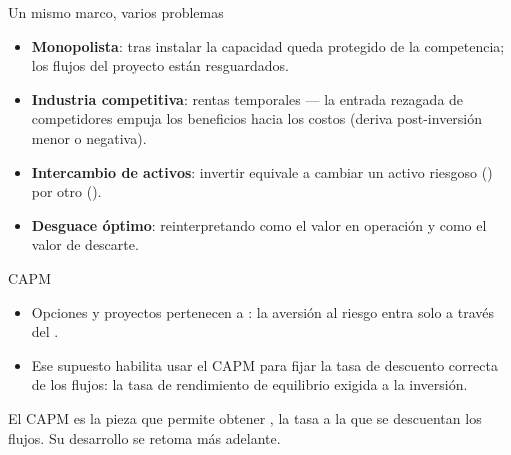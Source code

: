 \begin{frame}{Un mismo marco, varios problemas}
  \begin{itemize}
    \item \textbf{Monopolista}: tras instalar la capacidad queda protegido
          de la competencia; los flujos del proyecto están resguardados.
    \item \textbf{Industria competitiva}: rentas temporales --- la entrada
          rezagada de competidores empuja los beneficios hacia los costos
          (deriva post-inversión menor o negativa).
    \item \textbf{Intercambio de activos}: invertir equivale a cambiar un
          activo riesgoso () por otro ().
    \item \textbf{Desguace óptimo}: reinterpretando  como el valor
          en operación y  como el valor de descarte.
  \end{itemize}
\end{frame}

\begin{frame}{CAPM}
  \begin{itemize}
    \item Opciones y proyectos pertenecen a : la aversión al riesgo entra solo a través del
          .
    \item Ese supuesto habilita usar el CAPM para fijar la tasa de
          descuento correcta de los flujos: la tasa de rendimiento
          de equilibrio exigida a la inversión.
  \end{itemize}
  \begin{cajatexto}
    El CAPM es la pieza que permite obtener \az{$\mu$}, la tasa a la que se
    descuentan los flujos. Su desarrollo se retoma más adelante.
  \end{cajatexto}
\end{frame}

